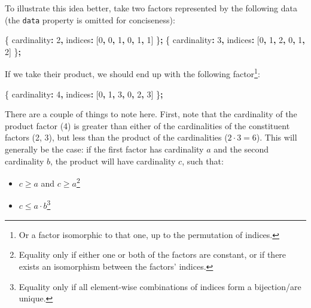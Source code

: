 \documentclass[
  openany]{book}
\newenvironment{Shaded}{\begin{snugshade}}{\end{snugshade}}
\newcommand{\DecValTok}[1]{\textcolor[rgb]{0.00,0.00,0.81}{#1}}
\newcommand{\NormalTok}[1]{#1}
\newcommand{\OperatorTok}[1]{\textcolor[rgb]{0.81,0.36,0.00}{\textbf{#1}}}
\providecommand{\tightlist}{%
  \setlength{\itemsep}{0pt}\setlength{\parskip}{0pt}}
\theoremstyle{definition}
\theoremstyle{definition}
\theoremstyle{definition}
\theoremstyle{definition}
\theoremstyle{remark}
\begin{document}
To illustrate this idea better, take two factors represented by the following data (the \texttt{data} property is omitted for conciseness):

\begin{Shaded}
\begin{Highlighting}[]
\NormalTok{\{ cardinality}\OperatorTok{:} \DecValTok{2}\OperatorTok{,}\NormalTok{ indices}\OperatorTok{:}\NormalTok{ [}\DecValTok{0}\OperatorTok{,} \DecValTok{0}\OperatorTok{,} \DecValTok{1}\OperatorTok{,} \DecValTok{0}\OperatorTok{,} \DecValTok{1}\OperatorTok{,} \DecValTok{1}\NormalTok{] \}}\OperatorTok{;}
\NormalTok{\{ cardinality}\OperatorTok{:} \DecValTok{3}\OperatorTok{,}\NormalTok{ indices}\OperatorTok{:}\NormalTok{ [}\DecValTok{0}\OperatorTok{,} \DecValTok{1}\OperatorTok{,} \DecValTok{2}\OperatorTok{,} \DecValTok{0}\OperatorTok{,} \DecValTok{1}\OperatorTok{,} \DecValTok{2}\NormalTok{] \}}\OperatorTok{;}
\end{Highlighting}
\end{Shaded}

If we take their product, we should end up with the following factor\footnote{Or a factor isomorphic to that one, up to the permutation of indices.}:

\begin{Shaded}
\begin{Highlighting}[]
\NormalTok{\{ cardinality}\OperatorTok{:} \DecValTok{4}\OperatorTok{,}\NormalTok{ indices}\OperatorTok{:}\NormalTok{ [}\DecValTok{0}\OperatorTok{,} \DecValTok{1}\OperatorTok{,} \DecValTok{3}\OperatorTok{,} \DecValTok{0}\OperatorTok{,} \DecValTok{2}\OperatorTok{,} \DecValTok{3}\NormalTok{] \}}\OperatorTok{;}
\end{Highlighting}
\end{Shaded}

There are a couple of things to note here. First, note that the cardinality of the product factor (4) is greater than either of the cardinalities of the constituent factors (2, 3), but less than the product of the cardinalities (\(2 \cdot 3 = 6\)). This will generally be the case: if the first factor has cardinality \(a\) and the second cardinality \(b\), the product will have cardinality \(c\), such that:

\begin{itemize}
\tightlist
\item
  \(c \geq a\) and \(c \geq a\)\footnote{Equality only if either one or both of the factors are constant, or if there exists an isomorphism between the factors' indices.}
\item
  \(c \leq a \cdot b\)\footnote{Equality only if all element-wise combinations of indices form a bijection/are unique.}
\end{itemize}
\end{document}
